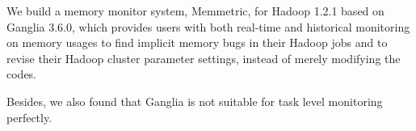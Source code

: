 We build a memory monitor system, Memmetric, for Hadoop 1.2.1 based on Ganglia 3.6.0, which provides users with both real-time and historical monitoring on memory usages to find implicit memory bugs in their Hadoop jobs and to revise their Hadoop cluster parameter settings, instead of merely modifying the codes.

Besides, we also found that Ganglia is not suitable for task level monitoring perfectly. 